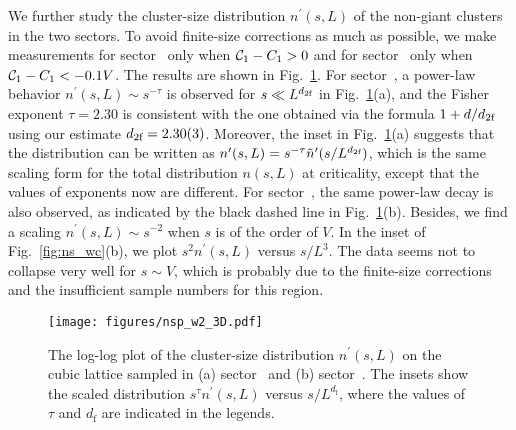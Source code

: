 We further study the cluster-size distribution $n^\prime(s, L)$ of the non-giant clusters in the two sectors. To avoid finite-size corrections
as much as possible, we make measurements for sector~ only when ${\mathcal C}_1 - C_1 > 0$ and for sector~ only when ${\mathcal C}_1 - C_1 < -0.1V$.
The results are shown in Fig.~\ref{fig:nsp_w2_3D}. For sector~, a power-law behavior $n^\prime(s, L) \sim s^{-\tau}$ is observed
for $s \ll L^{{d_{2\textrm{f}}}}$ in Fig.~\ref{fig:nsp_w2_3D}(a), and the Fisher exponent $\tau = 2.30$ is consistent with the one obtained via the formula $1+d/{d_{2\textrm{f}}}$ using our estimate ${d_{2\textrm{f}}}=2.30(3)$.
Moreover, the inset in Fig.~\ref{fig:nsp_w2_3D}(a) suggests that the distribution can be written as $n^\prime(s, L) = s^{-\tau}\tilde{n}^\prime(s/L^{{d_{2\textrm{f}}}})$,
which is the same scaling form for the total distribution $n(s, L)$ at criticality, except that the values of exponents now are different.
For sector~, the same power-law decay is also observed, as indicated by the black dashed line in Fig.~\ref{fig:nsp_w2_3D}(b). Besides, we find a scaling
$n^\prime(s, L) \sim s^{-2}$ when $s$ is of the order of $V$. In the inset of Fig.~\ref{fig:ns_wc}(b), we plot $s^2 n^\prime(s, L)$ versus $s/L^3$. The data
seems not to collapse very well for $s \sim V$, which is probably due to the finite-size corrections and the insufficient sample numbers for this region.
\begin{figure}[H]
	\centering
	\texttt{[image: figures/nsp\_w2\_3D.pdf]}
	\caption{The log-log plot of the cluster-size distribution $n^\prime(s, L)$ on the cubic lattice sampled in (a) sector~ and (b) sector~. 
	The insets show the scaled distribution $s^\tau n^\prime(s, L)$ versus $s/L^{d_\text{f}}$, 
	where the values of $\tau$ and $d_\text{f}$ are indicated in the legends.}
	\label{fig:nsp_w2_3D}
\end{figure}




